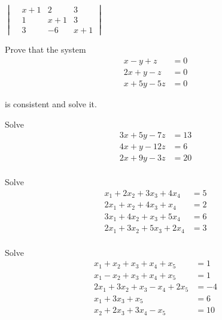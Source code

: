 \documentclass[11pt]{amsbook}
\begin{document}
\centerline{$\begin{vmatrix}
 &x+1 &2 &3 \\
 &1 &x+1 &3 \\
 &3 &-6 &x+1 
\end{vmatrix}$}
    \begin{hEnumerateArabic}
        \setcounter{enumi}{46}
        \item Prove that the system
            \begin{align*}
                x - y + z &= 0\\
                2x + y - z &= 0\\
                x + 5y - 5z &= 0
            \end{align*}
        
        \noindent is consistent and solve it.\\
     
        \item Solve
            \begin{align*}
                3x + 5y - 7z &= 13\\
                4x + y - 12z &= 6\\
                2x + 9y - 3z &= 20\\
            \end{align*}
        
        \item Solve
            \begin{align*}
                x_{1} + 2x_{2} + 3x_{3}+ 4x_{4} &= 5\\
                2x_{1} + x_{2} + 4x_{3}+ x_{4} &= 2\\
                3x_{1} + 4x_{2} + x_{3}+ 5x_{4} &= 6\\
                2x_{1} + 3x_{2} + 5x_{3}+ 2x_{4} &= 3\\
            \end{align*}
        
        \item Solve
            \begin{align*}
                x_{1} + x_{2} + x_{3}+ x_{4}+ x_{5} &= 1\\
                x_{1} - x_{2} + x_{3}+ x_{4}+ x_{5} &= 1\\
                2x_{1} + 3x_{2} + x_{3}- x_{4}+ 2x_{5} &= -4\\
                x_{1} + 3x_{3}+ x_{5} &= 6\\
                x_{2} + 2x_{3}+ 3x_{4}- x_{5} &= 10\\
            \end{align*}
    
    \end{hEnumerateArabic}
    
\end{document}
